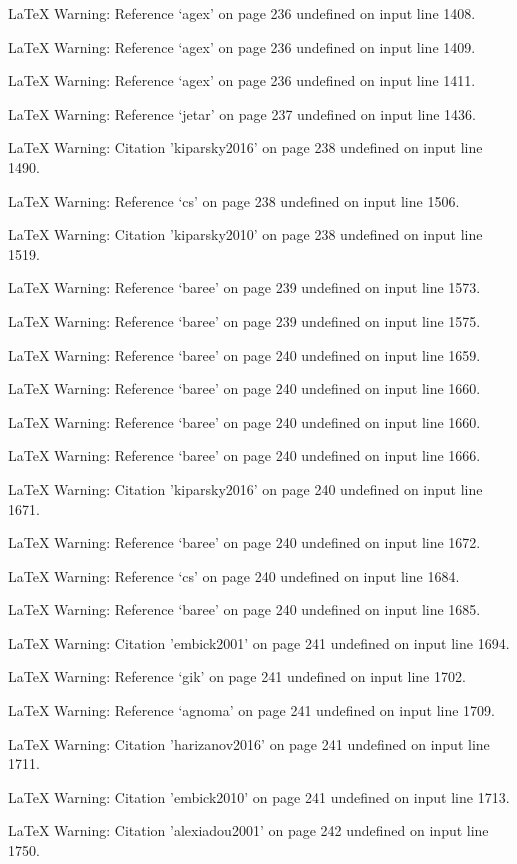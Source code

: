 LaTeX Warning: Reference `agex' on page 236 undefined on input line 1408.


LaTeX Warning: Reference `agex' on page 236 undefined on input line 1409.


LaTeX Warning: Reference `agex' on page 236 undefined on input line 1411.


LaTeX Warning: Reference `jetar' on page 237 undefined on input line 1436.


LaTeX Warning: Citation 'kiparsky2016' on page 238 undefined on input line 1490.


LaTeX Warning: Reference `cs' on page 238 undefined on input line 1506.


LaTeX Warning: Citation 'kiparsky2010' on page 238 undefined on input line 1519.


LaTeX Warning: Reference `baree' on page 239 undefined on input line 1573.


LaTeX Warning: Reference `baree' on page 239 undefined on input line 1575.


LaTeX Warning: Reference `baree' on page 240 undefined on input line 1659.


LaTeX Warning: Reference `baree' on page 240 undefined on input line 1660.


LaTeX Warning: Reference `baree' on page 240 undefined on input line 1660.


LaTeX Warning: Reference `baree' on page 240 undefined on input line 1666.


LaTeX Warning: Citation 'kiparsky2016' on page 240 undefined on input line 1671.


LaTeX Warning: Reference `baree' on page 240 undefined on input line 1672.


LaTeX Warning: Reference `cs' on page 240 undefined on input line 1684.


LaTeX Warning: Reference `baree' on page 240 undefined on input line 1685.


LaTeX Warning: Citation 'embick2001' on page 241 undefined on input line 1694.


LaTeX Warning: Reference `gik' on page 241 undefined on input line 1702.


LaTeX Warning: Reference `agnoma' on page 241 undefined on input line 1709.


LaTeX Warning: Citation 'harizanov2016' on page 241 undefined on input line 1711.


LaTeX Warning: Citation 'embick2010' on page 241 undefined on input line 1713.


LaTeX Warning: Citation 'alexiadou2001' on page 242 undefined on input line 1750.


